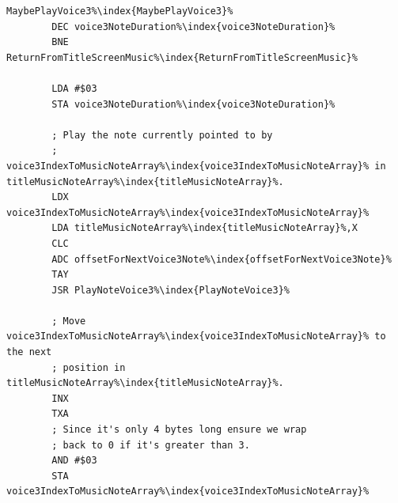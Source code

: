 \begin{lstlisting}[caption= \icode{MaybePlayVoice3\index{MaybePlayVoice3}}\, part of \icode{PlayTitleScreenMusic\index{PlayTitleScreenMusic}}.,escapechar=\%]
MaybePlayVoice3%\index{MaybePlayVoice3}%   
        DEC voice3NoteDuration%\index{voice3NoteDuration}%
        BNE ReturnFromTitleScreenMusic%\index{ReturnFromTitleScreenMusic}%

        LDA #$03
        STA voice3NoteDuration%\index{voice3NoteDuration}%

        ; Play the note currently pointed to by 
        ; voice3IndexToMusicNoteArray%\index{voice3IndexToMusicNoteArray}% in titleMusicNoteArray%\index{titleMusicNoteArray}%.
        LDX voice3IndexToMusicNoteArray%\index{voice3IndexToMusicNoteArray}%
        LDA titleMusicNoteArray%\index{titleMusicNoteArray}%,X
        CLC
        ADC offsetForNextVoice3Note%\index{offsetForNextVoice3Note}%
        TAY
        JSR PlayNoteVoice3%\index{PlayNoteVoice3}%

        ; Move voice3IndexToMusicNoteArray%\index{voice3IndexToMusicNoteArray}% to the next
        ; position in titleMusicNoteArray%\index{titleMusicNoteArray}%.
        INX
        TXA
        ; Since it's only 4 bytes long ensure we wrap
        ; back to 0 if it's greater than 3.
        AND #$03
        STA voice3IndexToMusicNoteArray%\index{voice3IndexToMusicNoteArray}%
\end{lstlisting}

